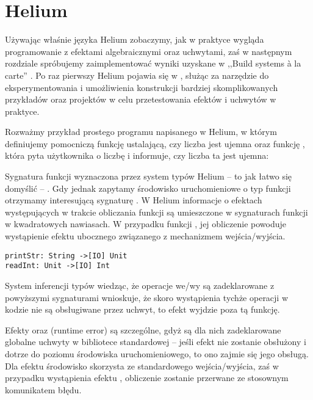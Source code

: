 \section{Helium}

\lstset{language=Haleff, showstringspaces=false}

Używając właśnie języka Helium zobaczymy, jak w praktyce wygląda programowanie z efektami algebraicznymi oraz uchwytami, zaś w następnym rozdziale spróbujemy zaimplementować wyniki uzyskane w ,,Build systems {\`a} la carte'' \cite{mokhov2018build, mokhov2020build}. Po raz pierwszy Helium pojawia się w \cite{biernacki2019abstracting}, służąc za narzędzie do eksperymentowania i umożliwienia konstrukcji bardziej skomplikowanych przykładów oraz projektów w celu przetestowania efektów i uchwytów w praktyce.

Rozważmy przykład prostego programu napisanego w Helium, w którym definiujemy pomocniczą funkcję  ustalającą, czy liczba jest ujemna oraz funkcję , która pyta użytkownika o liczbę i informuje, czy liczba ta jest ujemna:



Sygnatura funkcji  wyznaczona przez system typów Helium -- to jak łatwo się domyślić -- . Gdy jednak zapytamy środowisko uruchomieniowe o typ funkcji  otrzymamy interesującą sygnaturę . W Helium informacje o efektach występujących w trakcie obliczania funkcji są umieszczone w sygnaturach funkcji w kwadratowych nawiasach. W przypadku funkcji , jej obliczenie powoduje wystąpienie efektu ubocznego związanego z mechanizmem wejścia/wyjścia. 

\begin{lstlisting}
printStr: String ->[IO] Unit
readInt: Unit ->[IO] Int
\end{lstlisting}

System inferencji typów wiedząc, że operacje we/wy są zadeklarowane z powyższymi sygnaturami wnioskuje, że skoro wystąpienia tychże operacji w kodzie  nie są obsługiwane przez uchwyt, to efekt  wyjdzie poza tą funkcję.

Efekty  oraz  (runtime error) są szczególne, gdyż są dla nich zadeklarowane globalne uchwyty w bibliotece standardowej -- jeśli efekt nie zostanie obsłużony i dotrze do poziomu środowiska uruchomieniowego, to ono zajmie się jego obsługą. Dla efektu  środowisko skorzysta ze standardowego wejścia/wyjścia, zaś w przypadku wystąpienia efektu , obliczenie zostanie przerwane ze stosownym komunikatem błędu.

